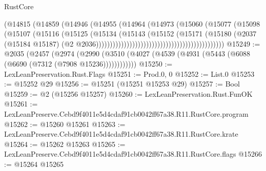 \begin{lexlean}{RustCore}
\begin{coremodule}
                                                          (@14815
                                                            (@14859
                                                              (@14946
                                                                (@14955
                                                                  (@14964
                                                                    (@14973
                                                                      (@15060
                                                                        (@15077
                                                                          (@15098
                                                                            (@15107
                                                                              (@15116
                                                                                (@15125
                                                                                  (@15134
                                                                                    (@15143
                                                                                      (@15152
                                                                                        (@15171
                                                                                          (@15180
                                                                                            (@2037
                                                                                              (@15184
                                                                                                @15187)
                                                                                              (@2
                                                                                                @2036))))))))))))))))))))))))))))))))))))))))))))))
@15249 := @2035
    (@2457
      (@2974
        (@2990 (@3510 (@4027 (@4539 (@4931 (@5443 (@6088 (@6690 (@7312 (@7908 @15236))))))))))))
@15250 := LexLeanPreservation.Rust.Flags
@15251 := Prod.{0, 0}
@15252 := List.{0}
@15253 := @15252 @29
@15256 := @15251 (@15251 @15253 @29)
@15257 := Bool
@15259 := @2 (@15256 @15257)
@15260 := LexLeanPreservation.Rust.FunOK
@15261 := LexLeanPreserve.Cebd9f4011e5d4cdaf91cb0042ff67a38.R11.RustCore.program
@15262 := @15260 @15261
@15263 := LexLeanPreserve.Cebd9f4011e5d4cdaf91cb0042ff67a38.R11.RustCore.krate
@15264 := @15262 @15263
@15265 := LexLeanPreserve.Cebd9f4011e5d4cdaf91cb0042ff67a38.R11.RustCore.flags
@15266 := @15264 @15265

\end{coremodule}
\end{lexlean}

